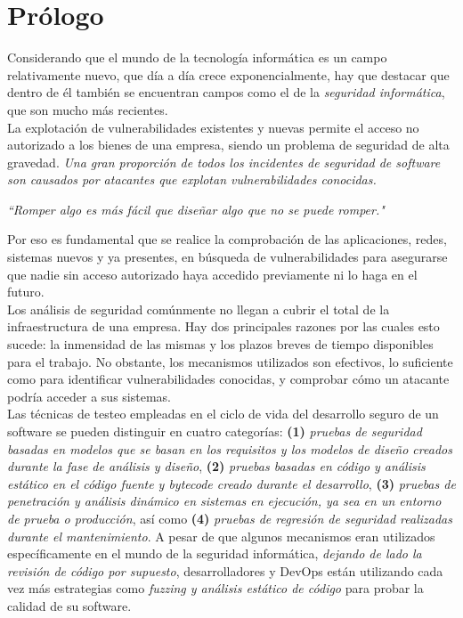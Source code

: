 \section{Prólogo}
Considerando que el mundo de la tecnología informática es un campo relativamente nuevo, que día a día crece exponencialmente, hay que destacar que dentro de él también se encuentran campos como el de la \textit{seguridad informática}, que son mucho más recientes.\\

La explotación de vulnerabilidades existentes y nuevas permite el acceso no autorizado a los bienes de una empresa, siendo un problema de seguridad de alta gravedad. \textit{Una gran proporción de todos los incidentes de seguridad de software son causados por atacantes que explotan vulnerabilidades conocidas.}\cite{sectesting}

\begin{displayquote}
\textit{``Romper algo es más fácil que diseñar algo que no se puede romper."}
\end{displayquote}

Por eso es fundamental que se realice la comprobación de las aplicaciones, redes, sistemas nuevos y ya presentes, en búsqueda de vulnerabilidades para asegurarse que nadie sin acceso autorizado haya accedido previamente ni lo haga en el futuro.\\

Los análisis de seguridad comúnmente no llegan a cubrir el total de la infraestructura de una empresa. Hay dos principales razones por las cuales esto sucede: la inmensidad de las mismas y los plazos breves de tiempo disponibles para el trabajo\cite{krypsys}\cite{specopssoft}\cite{crest}\cite{notsosecure}. No obstante, los mecanismos utilizados son efectivos, lo suficiente como para identificar vulnerabilidades conocidas, y comprobar cómo un atacante podría acceder a sus sistemas.\\

Las técnicas de testeo empleadas en el ciclo de vida del desarrollo seguro de un software se pueden distinguir en cuatro categorías: \textbf{(1)} \textit{pruebas de seguridad basadas en modelos que se basan en los requisitos y los modelos de diseño creados durante la fase de análisis y diseño}, \textbf{(2)} \textit{pruebas basadas en código y análisis estático en el código fuente y bytecode creado durante el desarrollo}, \textbf{(3)} \textit{pruebas de penetración y análisis dinámico en sistemas en ejecución, ya sea en un entorno de prueba o producción}, así como \textbf{(4)} \textit{pruebas de regresión de seguridad realizadas durante el mantenimiento}\cite{sectesting}. A pesar de que algunos mecanismos eran utilizados específicamente en el mundo de la seguridad informática, \textit{dejando de lado la revisión de código por supuesto}, desarrolladores y DevOps están utilizando cada vez más estrategias como \textit{fuzzing y análisis estático de código} para probar la calidad de su software\cite{accelerate_report}\cite{concepts}.

